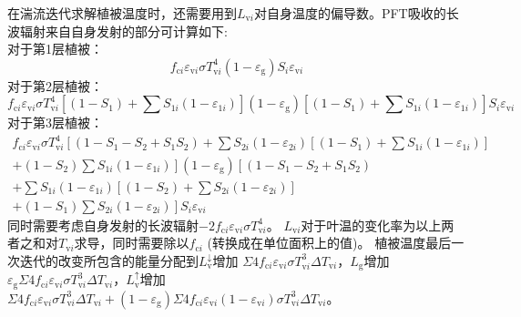 在湍流迭代求解植被温度时，还需要用到$L_{{\mathrm v}i}$对自身温度的偏导数。PFT吸收的长波辐射来自自身发射的部分可计算如下: \\
%
对于第1层植被：
\begin{equation}\label{eq:dlv1}
  f_{{\mathrm c}i} \varepsilon_{{\mathrm v}i} \sigma T_{{\mathrm v}i}^{4}\left(1-\varepsilon_{\mathrm{g}}\right) S_{i} \varepsilon_{\mathrm{v}i}
\end{equation}
对于第2层植被：
\begin{equation}\label{eq:dlv2}
  f_{{\mathrm c}i} \varepsilon_{{\mathrm v}i} \sigma T_{{\mathrm v}i}^{4}\left[\left(1-S_{1}\right)+\sum S_{1 i}\left(1-\varepsilon_{1 i}\right)\right]
  \left(1-\varepsilon_{\mathrm{g}}\right)\left[\left(1-S_{1}\right)+\sum S_{1 i}\left(1-\varepsilon_{1 i}\right)\right] S_{i} \varepsilon_{\mathrm{v}i}
\end{equation}
对于第3层植被：
\begin{equation}\label{eq:dlv3}
  \begin{aligned}
    f_{\mathrm{c}i} \varepsilon_{\mathrm{v}i} \sigma T_{\mathrm{v}i}^{4}\left[\left(1-S_{1}-S_{2}+S_{1} S_{2}\right)+
    \sum S_{2 i}\left(1-\varepsilon_{2 i}\right)\left[\left(1-S_{1}\right)+\sum S_{1 i}\left(1-\varepsilon_{1 i}\right)\right]\right.\\[1ex]
    \left.+\left(1-S_{2}\right) \sum S_{1 i}\left(1-\varepsilon_{1 i}\right)\right]\left(1-\varepsilon_{\mathrm{g}}\right)\left[\left(1-S_{1}-S_{2}+S_{1} S_{2}\right)\right.\\[1ex]
    +\sum S_{1 i}\left(1-\varepsilon_{1 i}\right)\left[\left(1-S_{2}\right)+\sum S_{2 i}\left(1-\varepsilon_{2 i}\right)\right] \\[1ex]
    \left.+\left(1-S_{1}\right)
    \sum S_{2 i}\left(1-\varepsilon_{2 i}\right)\right] S_{i} \varepsilon_{\mathrm{v}i}
  \end{aligned}
\end{equation}
同时需要考虑自身发射的长波辐射$-2f_{\mathrm{c}i}\varepsilon_{\mathrm{v}i}\sigma T_{\mathrm{v}i}^4$。
$L_{\mathrm{v}i}$对于叶温的变化率为以上两者之和对$T_{\mathrm{v}i}$求导，同时需要除以$f_{\mathrm{c}i}$ (转换成在单位面积上的值)。
植被温度最后一次迭代的改变所包含的能量分配到$L_{\mathrm {v}} ^\downarrow$增加
$\Sigma4f_{\mathrm{c}i}\varepsilon_{\mathrm{v}i}\sigma T_{\mathrm{v}i}^3\Delta T_{\mathrm{v}i}$，$L_{\mathrm{g}}$增加$\varepsilon_{\mathrm {g}}\Sigma4f_{\mathrm{c}i}\varepsilon_{\mathrm{v}i}\sigma T_{\mathrm{v}i}^3\Delta T_{\mathrm{v}i}$，$L_{\mathrm {v}} ^\uparrow$增加$\Sigma 4 f_{\mathrm{c}i} \varepsilon_{\mathrm{v}i} \sigma T_{\mathrm{v}i}^{3} \Delta T_{\mathrm{v}i}+\left(1-\varepsilon_{\mathrm{g}}\right) \Sigma 4 f_{\mathrm{c}i} \varepsilon_{\mathrm{v}i}\left(1-\varepsilon_{\mathrm{v}i}\right) \sigma T_{\mathrm{v}i}^{3} \Delta T_{\mathrm{v}i}$。


